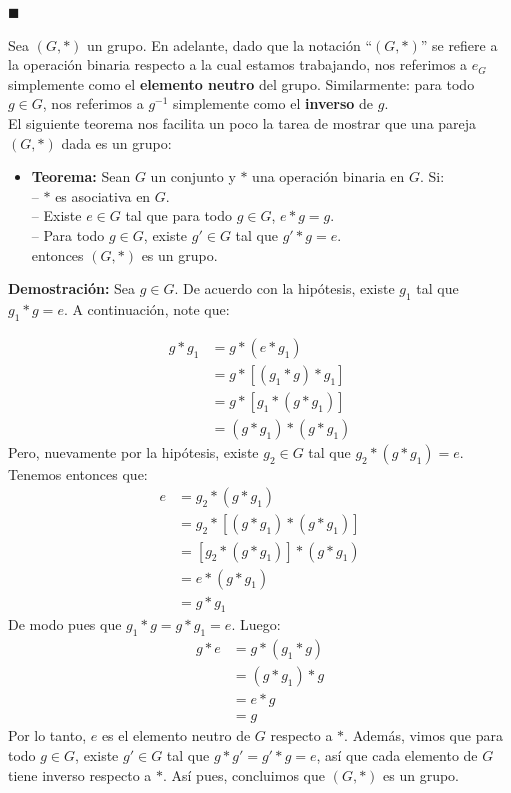 \documentclass[10 pt]{article}
\begin{document}
\begin{flushright}
    $\blacksquare$
\end{flushright}

\Large{Sea $(G,*)$ un grupo. En adelante, dado que la notación ``$(G,*)$'' se refiere a la operación binaria respecto a la cual estamos trabajando, nos referimos a $e_G$ simplemente como el \textbf{elemento neutro} del grupo. Similarmente: para todo $g \in G$, nos referimos a $g^{-1}$ simplemente como el \textbf{inverso} de $g$.} \\

\Large{El siguiente teorema nos facilita un poco la tarea de mostrar que una pareja $(G,*)$ dada es un grupo:} \\

\begin{itemize}
    \item \Large{\textbf{Teorema:} Sean $G$ un conjunto y $*$ una operación binaria en $G$. Si: \\

    -- $*$ es asociativa en $G$. \\

    -- Existe $e \in G$ tal que para todo $g \in G$, $e*g=g$. \\

    -- Para todo $g \in G$, existe $g' \in G$ tal que $g' *g=e$. \\

    entonces $(G,*)$ es un grupo.} \\
\end{itemize}

\Large{\textbf{Demostración:} Sea $g \in G$. De acuerdo con la hipótesis, existe $g_1$ tal que $g_1 *g=e$. A continuación, note que:}

\begin{align*}
    g*g_1&=g*(e*g_1) \\
    &=g*[(g_1*g)*g_1] \\
    &=g*[g_1*(g*g_1)] \\
    &=(g*g_1)*(g*g_1) 
\end{align*}
\Large{Pero, nuevamente por la hipótesis, existe $g_2 \in G$ tal que $g_2*(g*g_1)=e$. Tenemos entonces que:}
\begin{align*}
    e&=g_2*(g*g_1) \\
    &=g_2*[(g*g_1)*(g*g_1)] \\
    &=[g_2*(g*g_1)]*(g*g_1) \\
    &=e*(g*g_1) \\
    &=g*g_1
\end{align*}
\Large{De modo pues que $g_1*g=g*g_1=e$. Luego:}
\begin{align*}
    g*e&=g*(g_1*g) \\
    &=(g*g_1)*g \\
    &=e*g \\
    &=g
\end{align*}
\Large{Por lo tanto, $e$ es el elemento neutro de $G$ respecto a $*$. Además, vimos que para todo $g \in G$, existe $g' \in G$ tal que $g*g'=g'*g=e$, así que cada elemento de $G$ tiene inverso respecto a $*$. Así pues, concluimos que $(G,*)$ es un grupo.} \\
\end{document}
